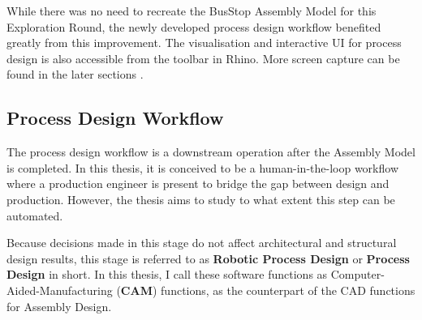 

While there was no need to recreate the BusStop Assembly Model for this Exploration Round, the newly developed process design workflow  benefited greatly from this improvement. The visualisation and interactive UI for process design is also accessible from the toolbar in Rhino. More screen capture can be found in the later sections .

\subsection{Process Design Workflow}
\label{subsection:exploration-3-process-design-workflow}

The process design workflow is a downstream operation after the Assembly Model is completed. In this thesis, it is conceived to be a human-in-the-loop workflow where a production engineer is present to bridge the gap between design and production. However, the thesis aims to study to what extent this step can be automated.

Because decisions made in this stage do not affect architectural and structural design results, this stage is referred to as\textbf{ Robotic Process Design} or \textbf{Process Design }in short. In this thesis, I call these software functions as Computer-Aided-Manufacturing (\textbf{CAM}) functions, as the counterpart of the CAD functions for Assembly Design.

